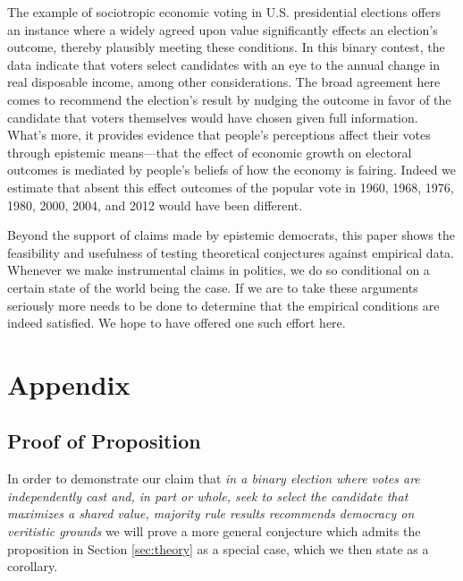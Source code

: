 \documentclass[11pt]{article}
\begin{document}
The example of sociotropic economic voting in U.S. presidential elections offers an instance where a widely agreed upon value significantly effects an election's outcome, thereby plausibly meeting these conditions. In this binary contest, the data indicate that voters select candidates with an eye to the annual change in real disposable income, among other considerations. The broad agreement here comes to recommend the election's result by nudging the outcome in favor of the candidate that voters themselves would have chosen given full information. What's more, it provides evidence that people's perceptions affect their votes through epistemic means---that the effect of economic growth on electoral outcomes is mediated by people's beliefs of how the economy is fairing. Indeed we estimate that absent this effect outcomes of the popular vote in 1960, 1968, 1976, 1980, 2000, 2004, and 2012 would have been different. 

Beyond the support of claims made by epistemic democrats, this paper shows the feasibility and usefulness of testing theoretical conjectures against empirical data. Whenever we make instrumental claims in politics, we do so conditional on a certain state of the world being the case. If we are to take these arguments seriously more needs to be done to determine that the empirical conditions are indeed satisfied. We hope to have offered one such effort here.



\section{Appendix}
\subsection{Proof of Proposition}


In order to demonstrate our claim that \emph{in a binary election where votes are independently cast and, in part or whole, seek to select the candidate that maximizes a shared value, majority rule results recommends democracy on veritistic grounds} 
we will prove a more general conjecture which admits the proposition in Section \ref{sec:theory} as a special case, which we then state as a corollary. 
\end{document}
